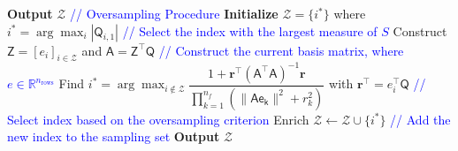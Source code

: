 \documentclass[11pt]{article}
\begin{document}
\begin{algorithm}[H]
\begin{algorithmic}[1]
                    \ENDFOR
                    \STATE \textbf{Output} $\mathcal{Z}$
                    \textcolor{blue}{// Oversampling Procedure}
                    \STATE \textbf{Initialize} $\mathcal{Z} = \{i^*\}$ where $i^* = \arg\max_i |\mathsf{Q}_{i,1}|$ \textcolor{blue}{// Select the index with the largest measure of $S$}
                        \STATE Construct $\mathsf{Z} = [\mathit{e}_i]_{i \in \mathcal{Z}}$ and $\mathsf{A} = \mathsf{Z}^\top \mathsf{Q}$ \textcolor{blue}{// Construct the current basis matrix, where $\mathit{e} \in \mathbb{R}^{n_{\text{rows}}}$}
                        \STATE Find $i^* = \arg\max_{i \notin \mathcal{Z}} \dfrac{1 + \mathbf{r}^\top (\mathsf{A}^\top \mathsf{A})^{-1} \mathbf{r}}{\prod_{k=1}^{n_f} (\|\mathsf{Ae_k}\|^2 + r_k^2)}$ with $\mathbf{r}^\top = \mathit{e}_i^\top \mathsf{Q}$ \textcolor{blue}{// Select index based on the oversampling criterion}
                        \STATE Enrich $\mathcal{Z} \leftarrow \mathcal{Z} \cup \{i^*\}$ \textcolor{blue}{// Add the new index to the sampling set}
                    \ENDFOR
                    \STATE \textbf{Output} $\mathcal{Z}$
                \end{algorithmic}
                \label{alg:S_OPT}
            \end{algorithm}
\end{document}
